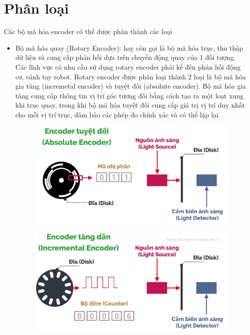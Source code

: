         \section{Phân loại}
        Các bộ mã hóa encoder có thể được phân thành các loại
        \begin{itemize}
            \item Bộ mã hóa quay (Rotary Encoder): hay còn gọi là bộ mã hóa trục, thu thập dữ liệu và cung cấp phản hồi dựa trên chuyển động quay của 1 đối tượng. Các lĩnh vực có nhu cầu sử dụng rotary encoder phải kể đến phản hồi động cơ, cánh tay robot. Rotary encoder được phân loại thành 2 loại là bộ mã hóa gia tăng (incremetal encoder) và tuyệt đối (absolute encoder). Bộ mã hóa gia tăng cung cấp thông tin vị trí góc tương đối bằng cách tạo ra một loạt xung khi trục quay, trong khi bộ mã hóa tuyệt đối cung cấp giá trị vị trí duy nhất cho mỗi vị trí trục, đảm bảo các phép đo chính xác và có thể lặp lại. 
            \begin{figure}[H]
                \centering
                \includegraphics[width=1\textwidth]{pictures/encoder1.png}
            \end{figure}
            \begin{figure}[H]
                \centering
                \includegraphics[width=1\textwidth]{pictures/encoder2.png}

\end{figure}
\end{itemize}
